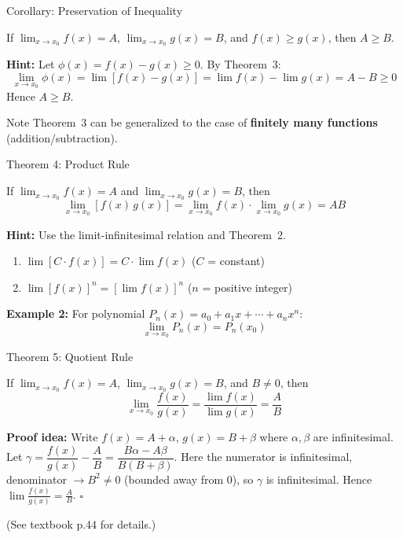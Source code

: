\documentclass[UTF8,10pt]{beamer}
\begin{document}
\begin{frame}{Corollary: Preservation of Inequality}
\begin{corollary}
If $\displaystyle \lim_{x\to x_0} f(x) = A$, $\displaystyle \lim_{x\to x_0} g(x) = B$, and $f(x) \ge g(x)$, then $A \ge B$.
\end{corollary}
\pause
\textbf{Hint:} Let $\phi(x) = f(x) - g(x) \ge 0$. By Theorem~3:
\[
\lim_{x\to x_0} \phi(x) = \lim[f(x)-g(x)] = \lim f(x) - \lim g(x) = A - B \ge 0
\]
\pause
Hence $A \ge B$.
\pause
\vspace{0.5em}
\begin{block}{Note}
Theorem~3 can be generalized to the case of \textbf{finitely many functions} (addition/subtraction).
\end{block}
\end{frame}

\begin{frame}{Theorem 4: Product Rule}
\begin{theorem}
If $\displaystyle \lim_{x\to x_0} f(x) = A$ and $\displaystyle \lim_{x\to x_0} g(x) = B$, then
\[
\lim_{x\to x_0} [f(x)\,g(x)] = \lim_{x\to x_0} f(x) \cdot \lim_{x\to x_0} g(x) = AB
\]
\end{theorem}
\pause
\textbf{Hint:} Use the limit-infinitesimal relation and Theorem~2.
\pause
\vspace{0.3em}
\begin{corollary}
\begin{enumerate}
    \item $\displaystyle \lim[C\cdot f(x)] = C \cdot \lim f(x)$ \hfill ($C$ = constant)
    \item $\displaystyle \lim [f(x)]^n = [\lim f(x)]^n$ \hfill ($n$ = positive integer)
\end{enumerate}
\end{corollary}
\pause
\vspace{0.3em}
\textbf{Example 2:} For polynomial $P_n(x) = a_0 + a_1 x + \cdots + a_n x^n$:
\[
\lim_{x\to x_0} P_n(x) = P_n(x_0)
\]
\end{frame}

\begin{frame}{Theorem 5: Quotient Rule}
\begin{theorem}
If $\displaystyle \lim_{x\to x_0} f(x) = A$, $\displaystyle \lim_{x\to x_0} g(x) = B$, and $B \neq 0$, then
\[
\lim_{x\to x_0} \frac{f(x)}{g(x)} = \frac{\lim f(x)}{\lim g(x)} = \frac{A}{B}
\]
\end{theorem}
\pause
\textbf{Proof idea:} Write $f(x) = A+\alpha$, $g(x) = B+\beta$ where $\alpha,\beta$ are infinitesimal.
Let $\gamma = \dfrac{f(x)}{g(x)} - \dfrac{A}{B} = \dfrac{B\alpha - A\beta}{B(B+\beta)}$.
\pause
Here the numerator is infinitesimal, denominator $\to B^2 \neq 0$ (bounded away from 0),
so $\gamma$ is infinitesimal. Hence $\displaystyle \lim \frac{f(x)}{g(x)} = \frac{A}{B}$. \hfill $\square$

\small (See textbook p.44 for details.)
\end{frame}
\end{document}
